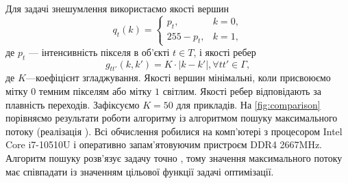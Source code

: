 Для задачі знешумлення використаємо якості вершин 
\begin{equation*}
    q_t(k) = 
    \begin{cases}
        p_t, & k = 0,\\
        255-p_t, & k = 1,
    \end{cases}
\end{equation*}
де $p_t$ --- інтенсивність пікселя в об'єкті $t\in T$, 
і якості ребер
\begin{equation*}
    g_{tt'}(k,k') = K\cdot|k-k'|, \forall tt'\in\Gamma,
\end{equation*}
де $K$---коефіцієнт згладжування.
Якості вершин мінімальні, коли присвоюємо мітку $0$ темним пікселям або мітку $1$ світлим.
Якості ребер відповідають за плавність переходів. Зафіксуємо $K=50$ для прикладів.
На \ref{fig:comparison} порівняємо результати роботи алгоритму із алгоритмом
пошуку максимального потоку (реалізація \cite{Boykov}). Всі обчислення робилися
на комп'ютері з процесором Intel Core i7-10510U і оперативно
запам'ятовуючим пристроєм DDR4 2667MHz. Алгоритм пошуку розв'язує задачу точно \cite{Boykov,Boykov_2,ishikawa,savchynskyy}, тому
значення максимального потоку має співпадати із значенням цільової функції задачі
оптимізації.
